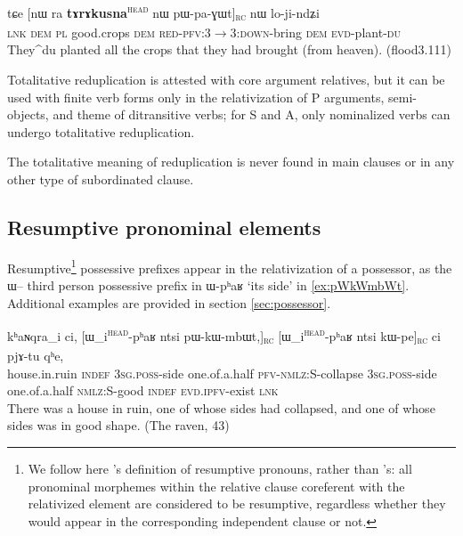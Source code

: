 \documentclass[oldfontcommands,oneside,a4paper,11pt]{article}
\newcommand{\ipa}[1]{{\phon #1}} %
\newcommand{\topic}{\textsc{dem}}
\newcommand{\tete}{\textsuperscript{\textsc{head}}}
\newcommand{\rc}{\textsubscript{\textsc{rc}}}
\begin{document}
  \begin{exe}
\ex \label{ex:pWpaGWt}
\gll
\ipa{tɕe}  	[\ipa{nɯ} \ipa{ra}  	\textbf{\ipa{tɤrɤkusna}}\tete{}  	\ipa{nɯ}  	\ipa{pɯ-pa-ɣɯt}]\rc{}  	\ipa{nɯ}  	\ipa{lo-ji-ndʑi}  \\
\textsc{lnk} \textsc{dem} \textsc{pl} good.crops \topic{} \textsc{red-pfv:3$\rightarrow$3:down}-bring \topic{} \textsc{evd}-plant-\textsc{du} \\
\glt They^{du} planted all the crops that they had brought (from heaven). (flood3.111)
\end{exe}
 
Totalitative reduplication is attested with core argument relatives, but it can be used with finite verb forms only in the relativization of P arguments, semi-objects, and theme of ditransitive verbs; for S and A, only nominalized verbs can undergo totalitative reduplication. 

The totalitative meaning of reduplication is never found in main clauses or in any other type of subordinated clause.


\subsection{Resumptive pronominal elements} \label{sec:resumptive}
 

Resumptive\footnote{We follow here \citet[211]{creissels06sgit2}'s definition of resumptive pronouns, rather than \citet{comrie81relative}'s: all pronominal morphemes within the relative clause coreferent with the relativized element are considered to be resumptive, regardless whether they would appear in the corresponding independent clause or not. } possessive prefixes appear in the relativization of a possessor, as the \ipa{ɯ}-- third person possessive prefix in \ipa{ɯ-pʰaʁ} `its side' in  \ref{ex:pWkWmbWt}. Additional examples are provided in section \ref{sec:possessor}.

  \begin{exe}
\ex \label{ex:pWkWmbWt}
\gll
\ipa{kʰaɴqra}_i  	\ipa{ci,}  	[\ipa{ɯ_i\tete{}-pʰaʁ}	\ipa{ntsi}  	\ipa{pɯ-kɯ-mbɯt,}]\rc{}  	[\ipa{ɯ_i\tete{}-pʰaʁ}   	\ipa{ntsi}  	\ipa{kɯ-pe}]\rc{}  	\ipa{ci}  	\ipa{pjɤ-tu}  	\ipa{qʰe,}  \\
house.in.ruin \textsc{indef} \textsc{3sg.poss}-side one.of.a.half \textsc{pfv-nmlz}:S-collapse \textsc{3sg.poss}-side one.of.a.half \textsc{nmlz}:S-good \textsc{indef} \textsc{evd.ipfv}-exist  \textsc{lnk} \\
\glt There was a house in ruin, one of whose sides had collapsed, and one of whose sides was in good shape. (The raven, 43)
\end{exe}
\end{document}

